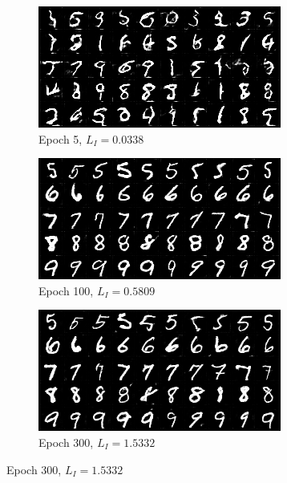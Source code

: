 \begin{figure}[htbp]
  \centering
  \begin{subfigure}[b]{\trif\textwidth}
    \includegraphics[width=\textwidth]{Img/fake-epoch-5.png}
    \caption{Epoch 5, $L_I=0.0338$}
  \end{subfigure}
  \begin{subfigure}[b]{\trif\textwidth}
    \includegraphics[width=\textwidth]{Img/fake-epoch-100.png}
    \caption{Epoch 100, $L_I=0.5809$}
  \end{subfigure}
  \begin{subfigure}[b]{\trif\textwidth}
    \includegraphics[width=\textwidth]{Img/fake-epoch-300.png}
    \caption{Epoch 300, $L_I=1.5332$}
  \end{subfigure}

  \label{fig:phase}
\end{figure}

